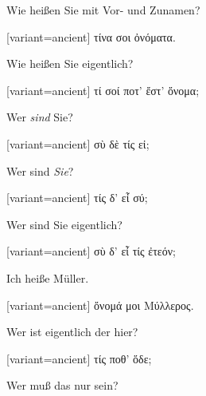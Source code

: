 Wie heißen Sie mit Vor- und Zunamen?

\switchcolumn

\begin{greek}[variant=ancient]%
τίνα σοι ὀνόματα.

\end{greek}%
\switchcolumn*

Wie heißen Sie eigentlich?

\switchcolumn

\begin{greek}[variant=ancient]%
τί σοί ποτ' ἔστ' ὄνομα;

\end{greek}%
\switchcolumn*

Wer \emph{sind} Sie?

\switchcolumn

\begin{greek}[variant=ancient]%
σὺ δὲ τίς εἰ;

\end{greek}%
\switchcolumn*

Wer sind \emph{Sie}?

\switchcolumn

\begin{greek}[variant=ancient]%
τίς δ' εἶ σύ;

\end{greek}%
\switchcolumn*

Wer sind Sie eigentlich?

\switchcolumn

\begin{greek}[variant=ancient]%
σὺ δ' εἶ τίς ἐτεόν;

\end{greek}%
\switchcolumn*

Ich heiße Müller.

\switchcolumn

\begin{greek}[variant=ancient]%
ὄνομά μοι Μύλλερος.

\end{greek}%
\switchcolumn*

Wer ist eigentlich der hier?

\switchcolumn

\begin{greek}[variant=ancient]%
τίς ποθ' ὅδε;

\end{greek}%
\switchcolumn*

Wer muß das nur sein?

\switchcolumn

